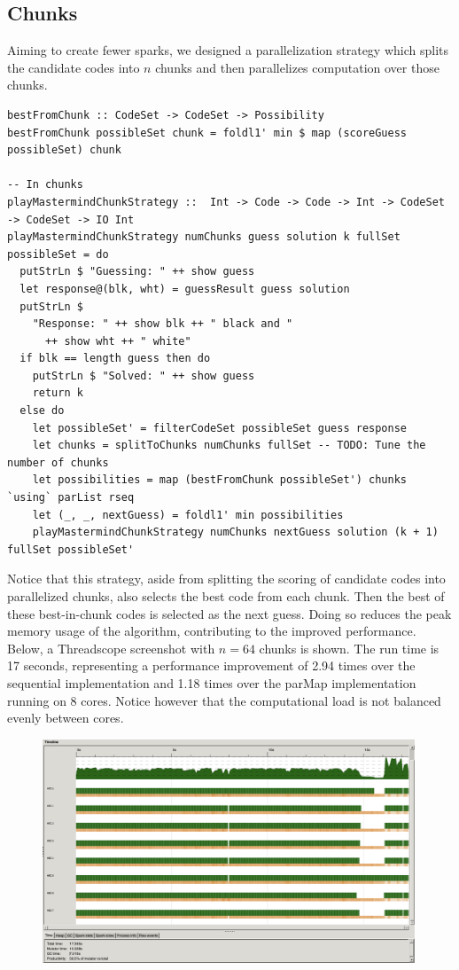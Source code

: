\documentclass{article}
\begin{document}
\subsection{Chunks}
Aiming to create fewer sparks, we designed a parallelization strategy which splits the candidate codes into $n$ chunks and then parallelizes computation over those chunks.
\begin{verbatim}
bestFromChunk :: CodeSet -> CodeSet -> Possibility
bestFromChunk possibleSet chunk = foldl1' min $ map (scoreGuess possibleSet) chunk

-- In chunks
playMastermindChunkStrategy ::  Int -> Code -> Code -> Int -> CodeSet -> CodeSet -> IO Int
playMastermindChunkStrategy numChunks guess solution k fullSet possibleSet = do
  putStrLn $ "Guessing: " ++ show guess
  let response@(blk, wht) = guessResult guess solution
  putStrLn $
    "Response: " ++ show blk ++ " black and "
      ++ show wht ++ " white"
  if blk == length guess then do
    putStrLn $ "Solved: " ++ show guess
    return k
  else do
    let possibleSet' = filterCodeSet possibleSet guess response
    let chunks = splitToChunks numChunks fullSet -- TODO: Tune the number of chunks
    let possibilities = map (bestFromChunk possibleSet') chunks `using` parList rseq
    let (_, _, nextGuess) = foldl1' min possibilities
    playMastermindChunkStrategy numChunks nextGuess solution (k + 1) fullSet possibleSet'
\end{verbatim}

Notice that this strategy, aside from splitting the scoring of candidate codes into parallelized chunks, also selects the best code from each chunk. Then the best of these best-in-chunk codes is selected as the next guess. Doing so reduces the peak memory usage of the algorithm, contributing to the improved performance. Below, a Threadscope screenshot with $n=64$ chunks is shown. The run time is 17 seconds, representing a performance improvement of 2.94 times over the sequential implementation and 1.18 times over the parMap implementation running on 8 cores. Notice however that the computational load is not balanced evenly between cores.

\begin{figure}[H]
	\centering
	\includegraphics[width=30em]{../images/64_sc.png}
\end{figure}
\end{document}
